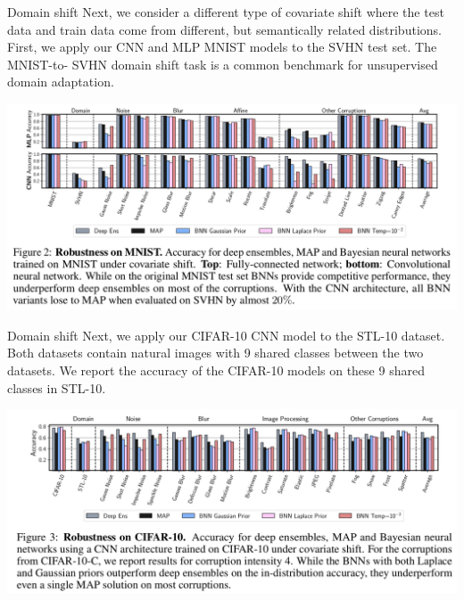 \documentclass{beamer}
\begin{document}
\begin{frame}{}
\begin{block}{Domain shift}
    Next, we consider a different type of covariate shift where the test data and train data come from
    different, but semantically related distributions.
    First, we apply our CNN and MLP MNIST models to the SVHN test set. The MNIST-to-
    SVHN domain shift task is a common benchmark for unsupervised domain adaptation.
\end{block}
    \includegraphics[scale=0.26]{figure2.png}
\end{frame}

\begin{frame}{}
\begin{block}{Domain shift}
    Next, we apply our CIFAR-10 CNN model to the STL-10 dataset. Both datasets contain natural
    images with 9 shared classes between the two datasets. We report the accuracy of the CIFAR-10
    models on these 9 shared classes in STL-10.
\end{block}
    \includegraphics[scale=0.22]{figure3.png}
\end{frame}
\end{document}
